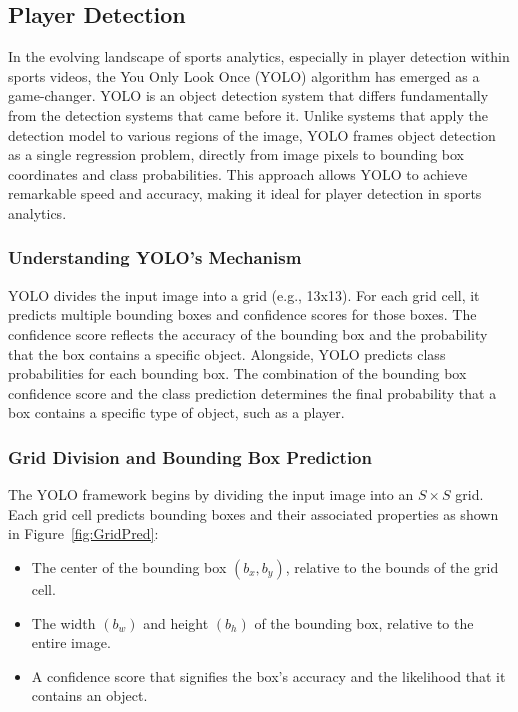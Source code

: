 \documentclass[12pt, letterpaper]{article}
\begin{document}
{
\setlength{\parskip}{0.3cm}
\subsection{Player Detection}
\begin{spacing}{1.2}

In the evolving landscape of sports analytics, especially in player detection within sports videos, the You Only Look Once (YOLO) algorithm has emerged as a game-changer. YOLO is an object detection system that differs fundamentally from the detection systems that came before it. Unlike systems that apply the detection model to various regions of the image, YOLO frames object detection as a single regression problem, directly from image pixels to bounding box coordinates and class probabilities. This approach allows YOLO to achieve remarkable speed and accuracy, making it ideal for player detection in sports analytics.

\subsubsection{Understanding YOLO's Mechanism}
YOLO divides the input image into a grid (e.g., 13x13). For each grid cell, it predicts multiple bounding boxes and confidence scores for those boxes. The confidence score reflects the accuracy of the bounding box and the probability that the box contains a specific object. Alongside, YOLO predicts class probabilities for each bounding box. The combination of the bounding box confidence score and the class prediction determines the final probability that a box contains a specific type of object, such as a player.

\subsubsection{Grid Division and Bounding Box Prediction}

The YOLO framework begins by dividing the input image into an $S \times S$ grid. Each grid cell predicts bounding boxes and their associated properties as shown in Figure~\ref{fig:GridPred}:

\begin{itemize}
    \item The center of the bounding box $(b_x, b_y)$, relative to the bounds of the grid cell.
    \item The width $(b_w)$ and height $(b_h)$ of the bounding box, relative to the entire image.
    \item A confidence score that signifies the box's accuracy and the likelihood that it contains an object.
\end{itemize}


\end{spacing}}
\end{document}
